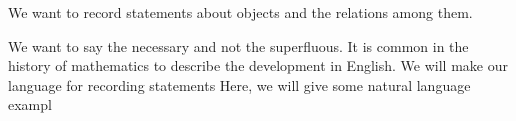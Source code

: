 

We want to record statements about objects and the relations among them.


We want to say the necessary and not the superfluous.
It is common in the history of mathematics to describe the development in English.
We will make our language for recording statements
Here, we will give some natural language exampl

\begin{account}
\end{account}

\begin{account}
\end{account}

\begin{account}
\end{account}

\blankpage
